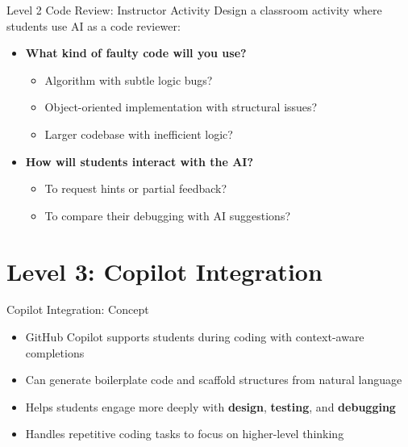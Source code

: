\documentclass[xcolor=dvipsnames, aspectratio=169]{beamer}
\begin{document}
\begin{frame}{Level 2 Code Review: Instructor Activity}
  Design a classroom activity where students use AI as a code reviewer:
  
  \begin{itemize}
    \item \textbf{What kind of faulty code will you use?}
      \begin{itemize}
        \item Algorithm with subtle logic bugs?
        \item Object-oriented implementation with structural issues?
        \item Larger codebase with inefficient logic?
      \end{itemize}
    \item \textbf{How will students interact with the AI?}
      \begin{itemize}
        \item To request hints or partial feedback?
        \item To compare their debugging with AI suggestions?
      \end{itemize}
  \end{itemize}
\end{frame}

\section{Level 3: Copilot Integration}

\begin{frame}{Copilot Integration: Concept}
  \begin{itemize}
    \item GitHub Copilot supports students during coding with context-aware completions
    \item Can generate boilerplate code and scaffold structures from natural language
    \item Helps students engage more deeply with \textbf{design}, \textbf{testing}, and \textbf{debugging}
    \item Handles repetitive coding tasks to focus on higher-level thinking
  \end{itemize}
\end{frame}
\end{document}
